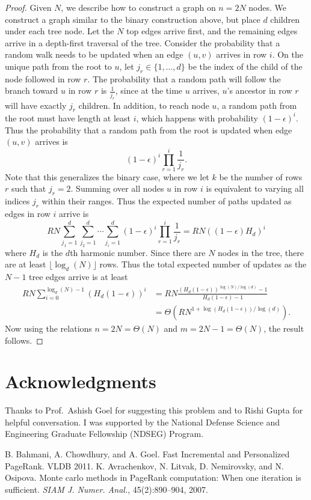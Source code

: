 \documentclass{article}
\newcommand{\pn}[1]{\left( #1 \right)}
\begin{document}
\begin{proof}
  Given $N$, we describe how to construct a graph on $n=2N$ nodes.  We construct a graph similar to the binary construction above, but place $d$ children under each tree node.  Let the $N$ top edges arrive first, and the remaining edges arrive in a depth-first traversal of the tree.  Consider the probability that a random walk needs to be updated when an edge $(u, v)$ arrives in row $i$.  On the unique path from the root to $u$, let $j_r \in \{1,\ldots, d\}$ be the index of the child of the node followed in row $r$.  The probability that a random path will follow the branch toward $u$ in row $r$ is $\frac{1}{j_r}$, since at the time $u$ arrives, $u$'s ancestor in row $r$ will have exactly $j_r$ children.  In addition, to reach node $u$, a random path from the root must have  length at least $i$, which happens with probability $(1-\epsilon)^i$.  Thus the probability that a random path from the root is updated when edge $(u,v)$ arrives is \[(1-\epsilon)^i \prod_{r=1}^i \frac{1}{j_r}.\]
Note that this generalizes the binary case, where we let $k$ be the number of rows $r$ such that $j_r=2$.  Summing over all nodes $u$ in row $i$ is equivalent to varying all indices $j_r$ within their ranges.  Thus the expected number of paths updated as edges in row $i$ arrive is
\[RN \sum_{j_1=1}^d \sum_{j_2=1}^d \cdots \sum_{j_i=1}^d (1-\epsilon)^i \prod_{r=1}^i \frac{1}{j_r} = RN \pn{(1- \epsilon)H_d }^i \]
where $H_d$ is the $d$th harmonic number.
Since there are $N$ nodes in the tree, there are at least $\lfloor \log_d(N) \rfloor$ rows.  Thus the total expected number of updates as the $N-1$ tree edges arrive is at least
\begin{align*}
 R N \sum_{i=0}^{\log_d(N)-1}  \pn{H_d(1-\epsilon)}^i &= R N \frac{\pn{H_d(1-\epsilon)}^{\log(N)/\log(d)}-1}{H_d (1-\epsilon)-1}  \\&= \Theta \pn{RN^{1+\log(H_d (1-\epsilon))/\log(d)}}.
\end{align*}
Now using the relations $n=2N = \Theta(N)$ and $m=2N-1 = \Theta(N)$, the result follows.
\end{proof}
\section{Acknowledgments}
Thanks to Prof.~Ashish Goel for suggesting this problem and to Rishi Gupta for helpful conversation.  I was supported by the National Defense Science and Engineering Graduate Fellowship (NDSEG) Program.

\begin{thebibliography}{9}
 B. Bahmani, A. Chowdhury, and A. Goel. Fast Incremental and Personalized PageRank.  VLDB 2011.
 K. Avrachenkov, N. Litvak, D. Nemirovsky, and
N. Osipova. Monte carlo methods in PageRank
computation: When one iteration is sufficient. \textit{SIAM
J. Numer. Anal.}, 45(2):890–904, 2007.

\end{thebibliography}
\end{document}
